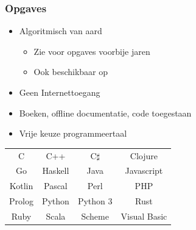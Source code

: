 \documentclass{ucll-slides}
\begin{document}
\begin{frame}
\begin{center}
  \end{center}
\end{frame}

\begin{frame}
  \frametitle{Opgaves}
  \begin{itemize}
    \item Algoritmisch van aard
          \begin{itemize}
            \item Zie  voor opgaves voorbije jaren
            \item Ook beschikbaar op 
          \end{itemize}
    \item Geen Internettoegang
    \item Boeken, offline documentatie, code toegestaan
    \item Vrije keuze programmeertaal
  \end{itemize}
  \begin{center}\small
    \begin{tabular}{cccc}
      C & C++ & C$\sharp$ & Clojure \\[2mm]
      Go & Haskell & Java & Javascript \\[2mm]
      Kotlin & Pascal & Perl & PHP \\[2mm]
      Prolog & Python & Python 3 & Rust \\[2mm]
      Ruby & Scala & Scheme & Visual Basic
    \end{tabular}
  \end{center}
\end{frame}
\end{document}
